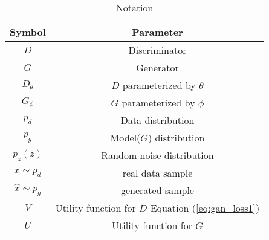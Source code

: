 \begin{table}[!htb]
    \centering
\begin{tabular}{ c|c }
\hline
 Symbol & Parameter \\ 
  \hline
  $D$ & Discriminator \\
  $G$ & Generator \\
  $D_{\theta}$ & $D$ parameterized by $\theta$\\
  $G_{\phi}$ & $G$ parameterized by $\phi$ \\ 
  $p_{d}$ & Data distribution \\
  $p_{g}$ & Model($G$) distribution\\
  $p_{z}(z)$ & Random noise distribution\\
  $x \sim p_{d}$ & real data sample \\
  $\hat{x} \sim p_{g}$ & generated sample \\
  $V$ & Utility function for $D$ Equation (\ref{eq:gan_loss1}) \\
  $U$ & Utility function for $G$ \\
 \hline
\end{tabular}
\caption{Notation} \label{tab:not} 
\end{table}



